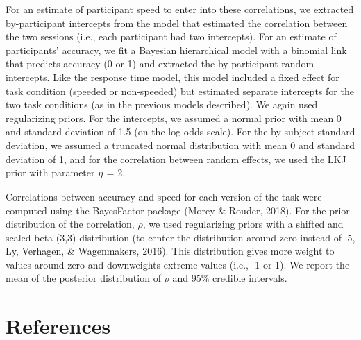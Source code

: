 \documentclass[
  man,floatsintext]{apa6}
\begin{document}
For an estimate of participant speed to enter into these correlations, we extracted by-participant intercepts from the model that estimated the correlation between the two sessions (i.e., each participant had two intercepts). For an estimate of participants' accuracy, we fit a Bayesian hierarchical model with a binomial link that predicts accuracy (0 or 1) and extracted the by-participant random intercepts. Like the response time model, this model included a fixed effect for task condition (speeded or non-speeded) but estimated separate intercepts for the two task conditions (as in the previous models described). We again used regularizing priors. For the intercepts, we assumed a normal prior with mean 0 and standard deviation of 1.5 (on the log odds scale). For the by-subject standard deviation, we assumed a truncated normal distribution with mean 0 and standard deviation of 1, and for the correlation between random effects, we used the LKJ prior with parameter \(\eta_{}\) = 2.

Correlations between accuracy and speed for each version of the task were computed using the BayesFactor package (Morey \& Rouder, 2018). For the prior distribution of the correlation, \(\rho{}\), we used regularizing priors with a shifted and scaled beta (3,3) distribution (to center the distribution around zero instead of .5, Ly, Verhagen, \& Wagenmakers, 2016). This distribution gives more weight to values around zero and downweights extreme values (i.e., -1 or 1). We report the mean of the posterior distribution of \(\rho{}\) and 95\% credible intervals.

\newpage

\hypertarget{references}{%
\section{References}\label{references}}

\begingroup
\setlength{\parindent}{-0.5in}
\setlength{\leftskip}{0.5in}
\end{document}
